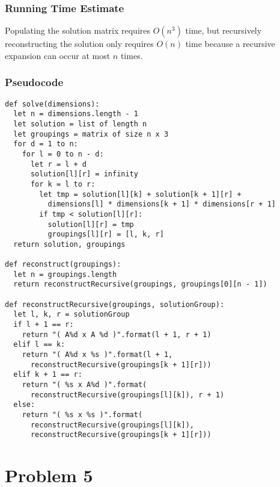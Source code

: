 \documentclass{math}
\begin{document}
\subsubsection*{Running Time Estimate}
Populating the solution matrix requires \( O(n^3) \) time, but recursively
reconstructing the solution only requires \( O(n) \) time because a recursive
expansion can occur at most \( n \) times.

\subsubsection*{Pseudocode}
\begin{lstlisting}
def solve(dimensions):
  let n = dimensions.length - 1
  let solution = list of length n
  let groupings = matrix of size n x 3
  for d = 1 to n:
    for l = 0 to n - d:
      let r = l + d
      solution[l][r] = infinity
      for k = l to r:
        let tmp = solution[l][k] + solution[k + 1][r] +
          dimensions[l] * dimensions[k + 1] * dimensions[r + 1]
        if tmp < solution[l][r]:
          solution[l][r] = tmp
          groupings[l][r] = [l, k, r]
  return solution, groupings

def reconstruct(groupings):
  let n = groupings.length
  return reconstructRecursive(groupings, groupings[0][n - 1])

def reconstructRecursive(groupings, solutionGroup):
  let l, k, r = solutionGroup
  if l + 1 == r:
    return "( A%d x A %d )".format(l + 1, r + 1)
  elif l == k:
    return "( A%d x %s )".format(l + 1,
      reconstructRecursive(groupings[k + 1][r]))
  elif k + 1 == r:
    return "( %s x A%d )".format(
      reconstructRecursive(groupings[l][k]), r + 1)
  else:
    return "( %s x %s )".format(
      reconstructRecursive(groupings[l][k]),
      reconstructRecursive(groupings[k + 1][r]))
\end{lstlisting}

\section*{Problem 5}
\end{document}
